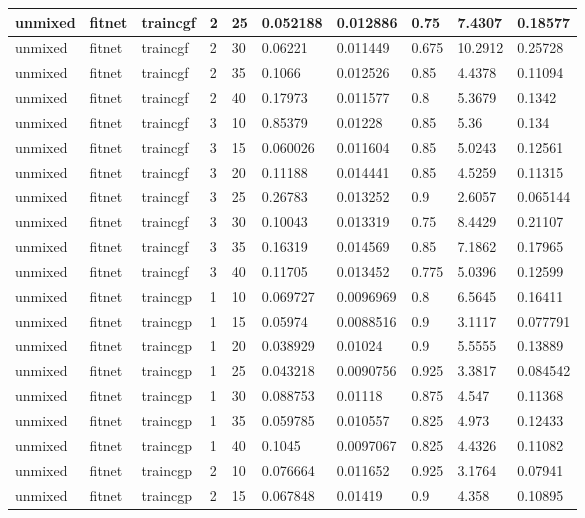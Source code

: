 \begin{longtable}{lllllllll}
unmixed & fitnet & traincgf & 2 & 25 & 0.052188 & 0.012886 & 0.75 & 7.4307 & 0.18577 \\ \hline 
unmixed & fitnet & traincgf & 2 & 30 & 0.06221 & 0.011449 & 0.675 & 10.2912 & 0.25728 \\ \hline 
unmixed & fitnet & traincgf & 2 & 35 & 0.1066 & 0.012526 & 0.85 & 4.4378 & 0.11094 \\ \hline 
unmixed & fitnet & traincgf & 2 & 40 & 0.17973 & 0.011577 & 0.8 & 5.3679 & 0.1342 \\ \hline 
unmixed & fitnet & traincgf & 3 & 10 & 0.85379 & 0.01228 & 0.85 & 5.36 & 0.134 \\ \hline 
unmixed & fitnet & traincgf & 3 & 15 & 0.060026 & 0.011604 & 0.85 & 5.0243 & 0.12561 \\ \hline 
unmixed & fitnet & traincgf & 3 & 20 & 0.11188 & 0.014441 & 0.85 & 4.5259 & 0.11315 \\ \hline 
unmixed & fitnet & traincgf & 3 & 25 & 0.26783 & 0.013252 & 0.9 & 2.6057 & 0.065144 \\ \hline 
unmixed & fitnet & traincgf & 3 & 30 & 0.10043 & 0.013319 & 0.75 & 8.4429 & 0.21107 \\ \hline 
unmixed & fitnet & traincgf & 3 & 35 & 0.16319 & 0.014569 & 0.85 & 7.1862 & 0.17965 \\ \hline 
unmixed & fitnet & traincgf & 3 & 40 & 0.11705 & 0.013452 & 0.775 & 5.0396 & 0.12599 \\ \hline 
unmixed & fitnet & traincgp & 1 & 10 & 0.069727 & 0.0096969 & 0.8 & 6.5645 & 0.16411 \\ \hline 
unmixed & fitnet & traincgp & 1 & 15 & 0.05974 & 0.0088516 & 0.9 & 3.1117 & 0.077791 \\ \hline 
unmixed & fitnet & traincgp & 1 & 20 & 0.038929 & 0.01024 & 0.9 & 5.5555 & 0.13889 \\ \hline 
unmixed & fitnet & traincgp & 1 & 25 & 0.043218 & 0.0090756 & 0.925 & 3.3817 & 0.084542 \\ \hline 
unmixed & fitnet & traincgp & 1 & 30 & 0.088753 & 0.01118 & 0.875 & 4.547 & 0.11368 \\ \hline 
unmixed & fitnet & traincgp & 1 & 35 & 0.059785 & 0.010557 & 0.825 & 4.973 & 0.12433 \\ \hline 
unmixed & fitnet & traincgp & 1 & 40 & 0.1045 & 0.0097067 & 0.825 & 4.4326 & 0.11082 \\ \hline 
unmixed & fitnet & traincgp & 2 & 10 & 0.076664 & 0.011652 & 0.925 & 3.1764 & 0.07941 \\ \hline 
unmixed & fitnet & traincgp & 2 & 15 & 0.067848 & 0.01419 & 0.9 & 4.358 & 0.10895 \\ \hline 

\end{longtable}
